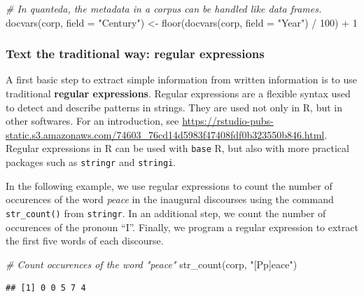 \documentclass[
  12pt,
]{style/krantz}
\newenvironment{Shaded}{\begin{snugshade}}{\end{snugshade}}
\newcommand{\AttributeTok}[1]{\textcolor[rgb]{0.77,0.63,0.00}{#1}}
\newcommand{\CommentTok}[1]{\textcolor[rgb]{0.56,0.35,0.01}{\textit{#1}}}
\newcommand{\DecValTok}[1]{\textcolor[rgb]{0.00,0.00,0.81}{#1}}
\newcommand{\FunctionTok}[1]{\textcolor[rgb]{0.00,0.00,0.00}{#1}}
\newcommand{\NormalTok}[1]{#1}
\newcommand{\OtherTok}[1]{\textcolor[rgb]{0.56,0.35,0.01}{#1}}
\newcommand{\SpecialCharTok}[1]{\textcolor[rgb]{0.00,0.00,0.00}{#1}}
\newcommand{\StringTok}[1]{\textcolor[rgb]{0.31,0.60,0.02}{#1}}
\begin{document}
\begin{Shaded}
\begin{Highlighting}[]
\CommentTok{\# In quanteda, the metadata in a corpus can be handled like data frames.}
\FunctionTok{docvars}\NormalTok{(corp, }\AttributeTok{field =} \StringTok{"Century"}\NormalTok{) }\OtherTok{\textless{}{-}} \FunctionTok{floor}\NormalTok{(}\FunctionTok{docvars}\NormalTok{(corp, }\AttributeTok{field =} \StringTok{"Year"}\NormalTok{) }\SpecialCharTok{/} \DecValTok{100}\NormalTok{) }\SpecialCharTok{+} \DecValTok{1}
\end{Highlighting}
\end{Shaded}

\hfill\break

\hypertarget{text-the-traditional-way-regular-expressions}{%
\subsubsection{Text the traditional way: regular expressions}\label{text-the-traditional-way-regular-expressions}}

A first basic step to extract simple information from written information is to use traditional \textbf{regular expressions}. Regular expressions are a flexible syntax used to detect and describe patterns in strings. They are used not only in R, but in other softwares. For an introduction, see \url{https://rstudio-pubs-static.s3.amazonaws.com/74603_76cd14d5983f47408fdf0b323550b846.html}. Regular expressions in R can be used with \texttt{base} R, but also with more practical packages such as \texttt{stringr} and \texttt{stringi}.

In the following example, we use regular expressions to count the number of occurences of the word \emph{peace} in the inaugural discourses using the command \texttt{str\_count()} from \texttt{stringr}. In an additional step, we count the number of occurences of the pronoun ``I''. Finally, we program a regular expression to extract the first five words of each discourse.

\begin{Shaded}
\begin{Highlighting}[]
\CommentTok{\# Count occurences of the word "peace"}
\FunctionTok{str\_count}\NormalTok{(corp, }\StringTok{"[Pp]eace"}\NormalTok{)}
\end{Highlighting}
\end{Shaded}

\begin{verbatim}
## [1] 0 0 5 7 4
\end{verbatim}
\end{document}
